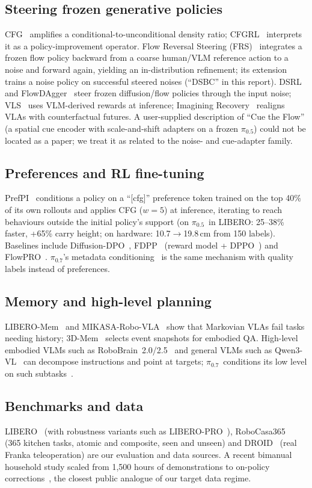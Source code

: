\documentclass[10pt,a4paper]{article}
\newcommand{\pzf}{$\pi_{0.5}$}
\newcommand{\pzs}{$\pi_{0.7}$}
\begin{document}
\subsection{Steering frozen generative policies}
CFG~\cite{cfg} amplifies a conditional-to-unconditional density ratio; CFGRL~\cite{cfgrl} interprets it as a policy-improvement operator. Flow Reversal Steering (FRS)~\cite{frs} integrates a frozen flow policy backward from a coarse human/VLM reference action to a noise and forward again, yielding an in-distribution refinement; its extension trains a noise policy on successful steered noises (``DSBC'' in this report). DSRL~\cite{dsrl} and FlowDAgger~\cite{flowdagger} steer frozen diffusion/flow policies through the input noise; VLS~\cite{vls} uses VLM-derived rewards at inference; Imagining Recovery~\cite{imagrecovery} realigns VLAs with counterfactual futures. A user-supplied description of ``Cue the Flow'' (a spatial cue encoder with scale-and-shift adapters on a frozen \pzf) could not be located as a paper; we treat it as related to the noise- and cue-adapter family.

\subsection{Preferences and RL fine-tuning}
PrefPI~\cite{prefpi} conditions a policy on a ``[cfg]'' preference token trained on the top 40\% of its own rollouts and applies CFG ($w=5$) at inference, iterating to reach behaviours outside the initial policy's support (on \pzf\ in LIBERO: 25--38\% faster, +65\% carry height; on hardware: 10.7$\rightarrow$19.8\,cm from 150 labels). Baselines include Diffusion-DPO~\cite{diffdpo}, FDPP~\cite{fdpp} (reward model + DPPO~\cite{dppo}) and FlowPRO~\cite{flowpro}. \pzs's metadata conditioning~\cite{pi07} is the same mechanism with quality labels instead of preferences.

\subsection{Memory and high-level planning}
LIBERO-Mem~\cite{liberomem} and MIKASA-Robo-VLA~\cite{mikasa} show that Markovian VLAs fail tasks needing history; 3D-Mem~\cite{3dmem} selects event snapshots for embodied QA. High-level embodied VLMs such as RoboBrain~2.0/2.5~\cite{robobrain} and general VLMs such as Qwen3-VL~\cite{qwen3vl} can decompose instructions and point at targets; \pzs\ conditions its low level on such subtasks~\cite{pi07}.

\subsection{Benchmarks and data}
LIBERO~\cite{libero} (with robustness variants such as LIBERO-PRO~\cite{liberopro}), RoboCasa365~\cite{robocasa365} (365 kitchen tasks, atomic and composite, seen and unseen) and DROID~\cite{droid} (real Franka teleoperation) are our evaluation and data sources. A recent bimanual household study scaled from 1,500 hours of demonstrations to on-policy corrections~\cite{agibot}, the closest public analogue of our target data regime.
\end{document}
